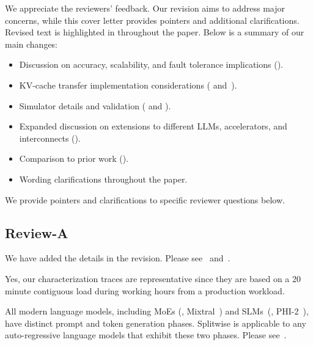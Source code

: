 
We appreciate the reviewers' feedback. Our revision aims to address major concerns, while this cover letter provides pointers and additional clarifications.
Revised text is highlighted in  throughout the paper.
Below is a summary of our main changes:
\begin{itemize}
    \item Discussion on accuracy, scalability, and fault tolerance implications ().
    \item KV-cache transfer implementation considerations ( and~).
    \item Simulator details and validation ( and ).
    \item Expanded discussion on extensions to different LLMs, accelerators, and interconnects ().
    \item Comparison to prior work ().
    \item Wording clarifications throughout the paper.
\end{itemize}

We provide pointers and clarifications to specific reviewer questions below.

\subsection{Review-A}
We have added the details in the revision. Please see~ and~.

Yes, our characterization traces are representative since they are based on a 20 minute contiguous load during working hours from a production workload.

All modern language models, including MoEs (\eg, Mixtral~\cite{jiang2024mixtral}) and SLMs~(\eg, PHI-2~\cite{phi2}), have distinct prompt and token generation phases.
Splitwise is applicable to any auto-regressive language models that exhibit these two phases.
Please see~.


